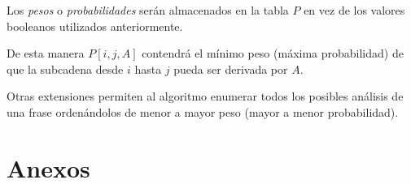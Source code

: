 \documentclass[letter, 10pt]{article}
\begin{document}
Los \emph{pesos} o \emph{probabilidades} serán almacenados en la tabla $P$ en
vez de los valores booleanos utilizados anteriormente.

De esta manera $P[i, j, A]$ contendrá el mínimo
peso (máxima probabilidad) de que la subcadena desde $i$ hasta $j$ pueda ser
derivada por $A$.

Otras extensiones permiten al algoritmo enumerar todos los
posibles análisis de una frase ordenándolos de menor a mayor peso (mayor a
menor probabilidad).


\newpage
\section{Anexos}
\end{document}
